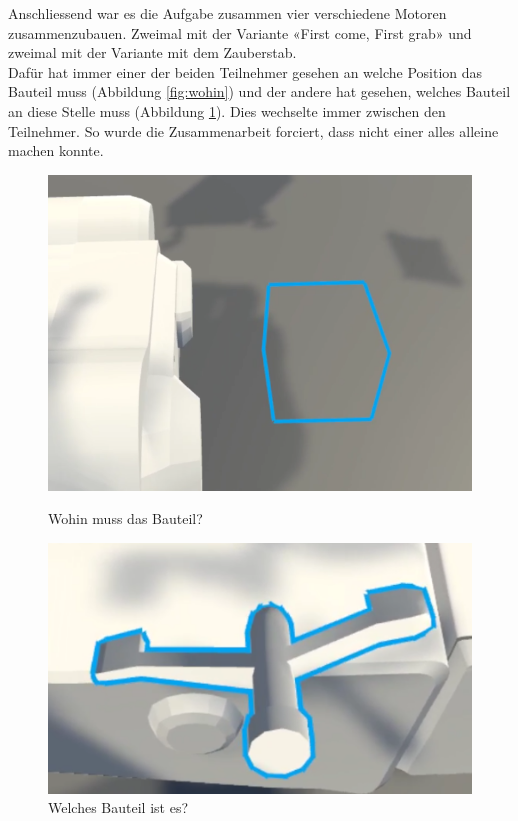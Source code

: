 \noindent Anschliessend war es die Aufgabe zusammen vier verschiedene Motoren zusammenzubauen. Zweimal mit der Variante «First come, First grab» und zweimal mit der Variante mit dem Zauberstab. \\
Dafür hat immer einer der beiden Teilnehmer gesehen an welche Position das Bauteil muss (Abbildung \ref{fig:wohin}) und der andere hat gesehen, welches Bauteil an diese Stelle muss (Abbildung \ref{fig:welches}). Dies wechselte immer zwischen den Teilnehmer. So wurde die Zusammenarbeit forciert, dass nicht einer alles alleine machen konnte.

\begin{figure}[h!]
	\centering
	\begin{minipage}[b]{0.49\linewidth}
		\centering
		\includegraphics[keepaspectratio,width=0.9\linewidth]{img/Wohin.PNG}
		\caption{Wohin muss das Bauteil?}
		\label{fig:wohin}
	\end{minipage}
	\hfill
	\begin{minipage}[b]{0.49\linewidth}
		\centering
		\includegraphics[keepaspectratio,width=0.9\linewidth]{img/Welches.PNG}
		\caption{Welches Bauteil ist es?}
		\label{fig:welches}
	\end{minipage}
\end{figure}

